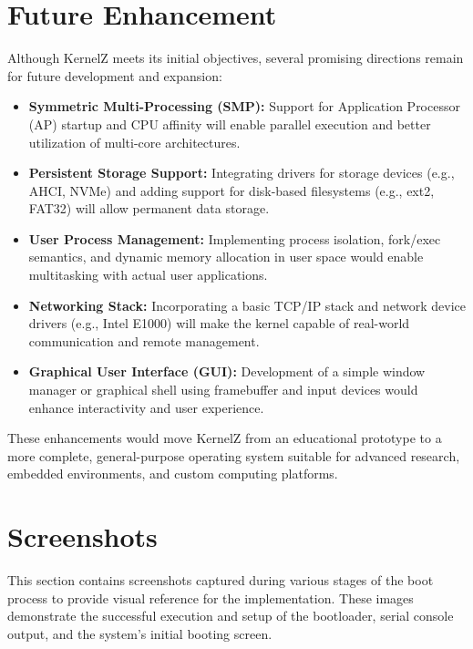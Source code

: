 \documentclass[12pt]{extarticle}
\begin{document}
\section{Future Enhancement}

Although KernelZ meets its initial objectives, several promising directions remain for future development and expansion:

\begin{itemize}
    \item \textbf{Symmetric Multi-Processing (SMP):} Support for Application Processor (AP) startup and CPU affinity will enable parallel execution and better utilization of multi-core architectures.
    
    \item \textbf{Persistent Storage Support:} Integrating drivers for storage devices (e.g., AHCI, NVMe) and adding support for disk-based filesystems (e.g., ext2, FAT32) will allow permanent data storage.

    \item \textbf{User Process Management:} Implementing process isolation, fork/exec semantics, and dynamic memory allocation in user space would enable multitasking with actual user applications.

    \item \textbf{Networking Stack:} Incorporating a basic TCP/IP stack and network device drivers (e.g., Intel E1000) will make the kernel capable of real-world communication and remote management.

    \item \textbf{Graphical User Interface (GUI):} Development of a simple window manager or graphical shell using framebuffer and input devices would enhance interactivity and user experience.
\end{itemize}

These enhancements would move KernelZ from an educational prototype to a more complete, general-purpose operating system suitable for advanced research, embedded environments, and custom computing platforms.

\pagebreak

\printbibliography
\pagebreak

\appendix
{}

\section{Screenshots}
This section contains screenshots captured during various stages of the boot
process to provide visual reference for the implementation. These images
demonstrate the successful execution and setup of the bootloader, serial console
output, and the system's initial booting screen.
\end{document}
